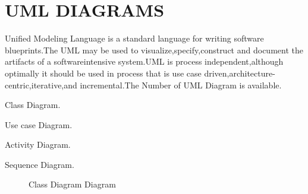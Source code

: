 \documentclass[oneside,a4paper,12pt]{report}
\begin{document}
\section{UML DIAGRAMS} 
\item Uniﬁed Modeling Language is a standard language for writing software blueprints.The UML may be used to visualize,specify,construct and document the artifacts of a softwareintensive system.UML is process independent,although optimally it should be used in process that is use case driven,architecture-centric,iterative,and incremental.The Number of UML Diagram is available.\\

 \item Class Diagram.\\
\item Use case Diagram.\\
 \item Activity Diagram.\\
\item Sequence Diagram.\\


 \begin{center}
	\begin{figure}[!htbp]
		\centering
	  \caption{Class Diagram Diagram}
	  \label{fig:class-dig}
	\end{figure}
\end{center} 
\newpage
\end{document}
